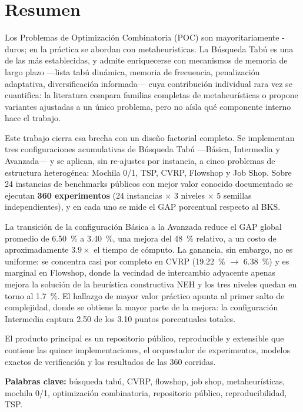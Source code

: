 \chapter*{Resumen}

Los Problemas de Optimización Combinatoria (POC) son mayoritariamente
\NP-duros; en la práctica se abordan con metaheurísticas. La
Búsqueda Tabú es una de las más establecidas, y admite enriquecerse con
mecanismos de memoria de largo plazo —lista tabú dinámica, memoria de
frecuencia, penalización adaptativa, diversificación informada— cuya
contribución individual rara vez se cuantifica: la literatura compara familias completas de
metaheurísticas o propone variantes ajustadas a un único problema, pero no
aísla qué componente interno hace el trabajo.

Este trabajo cierra esa brecha con un diseño factorial completo. Se
implementan tres configuraciones acumulativas de Búsqueda Tabú —Básica,
Intermedia y Avanzada— y se aplican, sin re-ajustes por instancia, a cinco
problemas de estructura heterogénea: Mochila 0/1, TSP, CVRP, Flowshop y Job
Shop. Sobre 24 instancias de benchmarks públicos con mejor valor conocido
documentado se ejecutan \textbf{360 experimentos} (24 instancias $\times$
3 niveles $\times$ 5 semillas independientes), y en cada uno se mide el GAP
porcentual respecto al BKS.

La transición de la configuración Básica a la Avanzada reduce el GAP global
promedio de \SI{6.50}{\percent} a \SI{3.40}{\percent}, una mejora del
\SI{48}{\percent} relativo, a un costo de aproximadamente $3.9\times$ el tiempo
de cómputo. La ganancia, sin embargo, no es uniforme: se concentra casi por
completo en CVRP (\SI{19.22}{\percent} $\rightarrow$ \SI{6.38}{\percent}) y es
marginal en Flowshop, donde la vecindad de intercambio adyacente apenas mejora
la solución de la heurística constructiva NEH y los tres niveles quedan en
torno al \SI{1.7}{\percent}. El hallazgo de mayor valor práctico apunta al primer salto de complejidad, donde se obtiene la mayor parte de la mejora: la configuración Intermedia captura 2.50 de los 3.10 puntos
porcentuales totales.

El producto principal es un repositorio público, reproducible y extensible que
contiene las quince implementaciones, el orquestador de experimentos, modelos
exactos de verificación y los resultados de las 360 corridas.

\vspace{1.5em}
\noindent\textbf{Palabras clave:} búsqueda tabú, CVRP, flowshop, job shop,
metaheurísticas, mochila 0/1, optimización combinatoria, repositorio público,
reproducibilidad, TSP.
